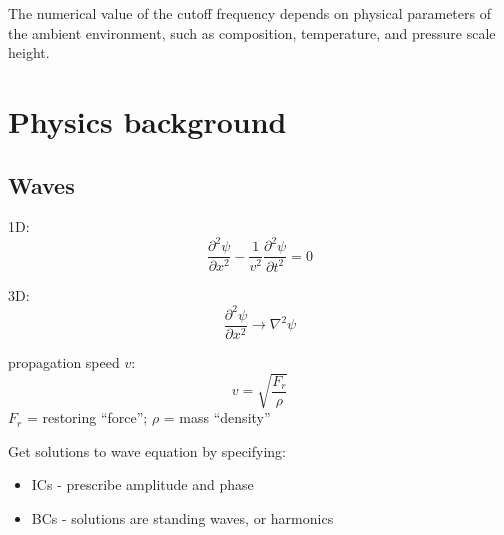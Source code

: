 
The numerical value of the cutoff
frequency depends on physical parameters of the ambient environment,
such as composition, temperature, and pressure scale height.


\clearpage
\section{Physics background}

\subsection{Waves}

1D:
\[
    \frac{\partial^{2}\psi}{\partial x^{2}}
    - \frac{1}{v^{2}}\frac{\partial^{2}\psi}{\partial t^{2}}
    = 0
    \]

3D:
\[
    \frac{\partial^{2}\psi}{\partial x^{2}} \rightarrow
    \nabla^{2}\psi
    \]


propagation speed $v$:
\[
    v = \sqrt{ \frac{F_{r}}{\rho}}
    \]
$F_{r}$ = restoring ``force'';
$\rho$ = mass ``density''

Get solutions to wave equation by specifying:
\begin{itemize}
    \item ICs - prescribe amplitude and phase
    \item BCs - solutions are standing waves, or harmonics
\end{itemize}


